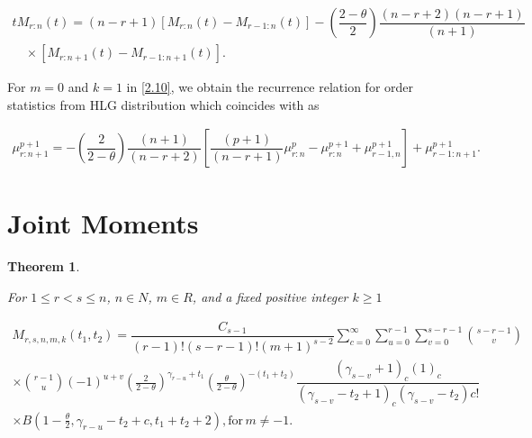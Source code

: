 \documentclass[11pt,a4paper]{article}
\numberwithin{equation}{section}
\newtheorem{theorem}{Theorem}[section]
\begin{document}
		\begin{eqnarray}

			tM_{r:n}(t)={(n-r+1)}\left[M_{r:n}(t)-M_{r-1:n}(t)\right]-\left(\dfrac{2-\theta}{2}\right)\dfrac{\left(n-r+2\right)\left(n-r+1\right)}{(n+1)}\nonumber \\ \,\,\,\,\,\,  \times\left[M_{r:n+1}{(t)}-M_{r-1:n+1}(t)\right].

		\end{eqnarray}

\noindent	 For $m=0$ and $k=1$ in \eqref{2.10}, we obtain the recurrence relation for order statistics from HLG distribution which coincides with \cite{liu2020recurrence} as 

		\begin{eqnarray}

			\mu_{r:n+1}^{p+1}=-{\left(\dfrac{2}{2-\theta}\right)}\dfrac{(n+1)}{(n-r+2)}\left[\dfrac{(p+1)}{(n-r+1)}\mu_{r:n}^{p}-\mu_{r:n}^{p+1}+\mu_{r-1,n}^{p+1}\right]+\mu_{r-1:n+1}^{p+1}.\nonumber

		\end{eqnarray}



	

\section{Joint Moments} \label{sec:joint}

	\begin{theorem}\label{mgf.theo}

		For $1\leq r<s\leq n$, $n \in{N}$, $m \in {R}$, and a fixed positive integer $k\ge 1$	

	\end{theorem}

	

	\begin{eqnarray} \label{mgf.joint}

		M_{r,s,n,m,k}(t_{1},t_{2}) =\dfrac{C_{s-1} }{\left(r-1\right)!\left(s-r-1\right)!(m+1)^{s-2}}\sum_{c=0}^{\infty}\sum_{u=0}^{r-1}\sum_{v=0}^{s-r-1}\binom{s-r-1}{v}\nonumber\\

		\times\binom{r-1}{u}(-1)^{u+v}\left(\frac{2}{2-\theta}\right)^{\gamma_{r-u}+t_{1}}\left(\frac{\theta}{2-\theta}\right)^{-(t_{1}+t_{2})}\dfrac{\left(\gamma_{s-v}+1\right)_{c}(1)_{c}}{\left(\gamma_{s-v}-t_{2}+1\right)_{c}\left(\gamma_{s-v}-t_{2}\right){c}!}\nonumber\\

		\times B\left(1-\frac{\theta}{2},\gamma_{r-u}-t_{2}+c,t_{1}+t_{2}+2\right),\text{for} \, m\neq {-1}.

	\end{eqnarray}
\end{document}
